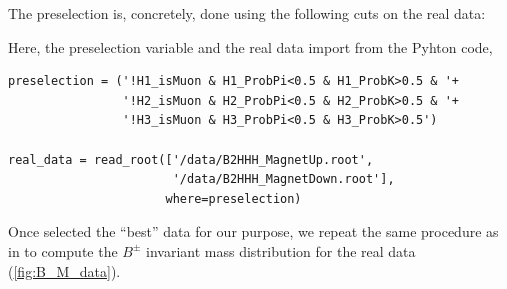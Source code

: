 The preselection is, concretely, done using the following cuts on the real data:

\begin{center}
\end{center}

Here, the preselection variable and the real data import from the Pyhton code,

\begin{lstlisting}
preselection = ('!H1_isMuon & H1_ProbPi<0.5 & H1_ProbK>0.5 & '+
                '!H2_isMuon & H2_ProbPi<0.5 & H2_ProbK>0.5 & '+
                '!H3_isMuon & H3_ProbPi<0.5 & H3_ProbK>0.5')

real_data = read_root(['/data/B2HHH_MagnetUp.root',
                       '/data/B2HHH_MagnetDown.root'],
                      where=preselection)
\end{lstlisting}

Once selected the \enquote{best} data for our purpose, we repeat the same procedure as in  to compute the $B^{\pm}$ invariant mass distribution for the real data (\autoref{fig:B_M_data}).

\begin{figure}[H]
	\centering
	\caption{} %
	\label{fig:B_M_data}
\end{figure}

